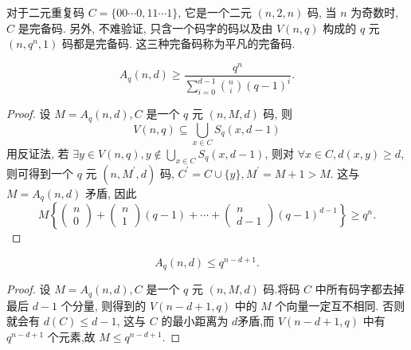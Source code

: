 对于二元重复码 $ C=\{00 \cdots 0,11 \cdots 1\} $, 它是一个二元 $ (n, 2, n) $ 码, 当 $ n $ 为奇数时, $ C $ 是完备码. 另外, 不难验证, 只含一个码字的码以及由 $ V(n, q) $ 构成的 $ q $ 元 $ \left(n, q^{n}, 1\right) $ 码都是完备码. 这三种完备码称为平凡的完备码.
\begin{theorem}
    $$
A_q(n, d) \geq \frac{q^n}{\sum\limits_{i=0}^{d-1} \binom{n}{i} (q-1)^i}.
$$
\end{theorem}
\begin{proof}
 设 $ M=A_{q}(n, d), C $ 是一个 $ q $ 元 $ (n, M, d) $ 码, 则
$$
V(n, q) \subseteq \bigcup_{x \in C} S_{q}(x, d-1)
$$
用反证法, 若 $ \exists y \in V(n, q), y \notin \bigcup_{x \in C} S_{q}(x, d-1) $, 则对 $ \forall x \in C, d(x, y) \geq d $, 则可得到一个 $ q $ 元 $ \left(n, M^{\prime}, d\right) $ 码, $ C^{\prime}=C \cup\{y\}, M^{\prime}=M+1>M $. 这与 $ M=A_{q}(n, d) $ 矛盾, 因此
$$
M\left\{\left(\begin{array}{l}
n \\
0
\end{array}\right)+\left(\begin{array}{c}
n \\
1
\end{array}\right)(q-1)+\cdots+\left(\begin{array}{c}
n \\
d-1
\end{array}\right)(q-1)^{d-1}\right\} \geq q^{n} .
$$
\end{proof}

\begin{theorem}[Singleton界]
    $$
A_{q}(n, d) \leq q^{n-d+1} .
$$
\end{theorem}
\begin{proof}
    设 $ M=A_{q}(n, d), C $ 是一个 $ q $ 元 $ (n, M, d) $ 码.将码 $ C $ 中所有码字都去掉最后 $ d-1 $ 个分量, 则得到的 $ V(n-d+1, q) $ 中的 $ M $ 个向量一定互不相同. 否则就会有 $ d(C) \leq d-1 $, 这与 $ C $ 的最小距离为 $ d $矛盾,而 $ V(n-d+1, q) $ 中有 $ q^{n-d+1} $ 个元素,故 $ M \leq q^{n-d+1} $.
\end{proof}

